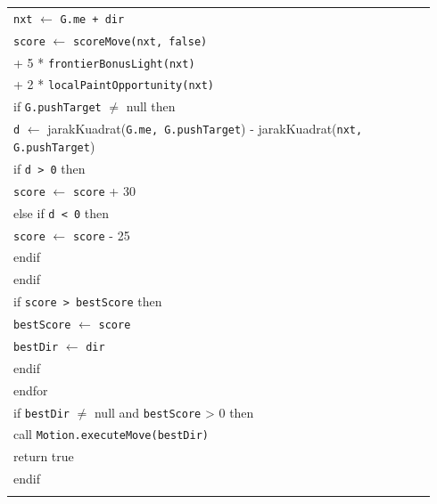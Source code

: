 \documentclass{article}
\newenvironment{pseudobox}
{
\centering
\begin{longtable}{|p{0.94\linewidth}|}
\hline
}
{
\\ \hline
\end{longtable}
\vspace{0.05cm}
}
\begin{document}
\begin{enumerate}[label=\alph*.]
\begin{enumerate}[label=\alph*.]
\begin{pseudobox}
\hspace*{3em}\texttt{nxt} $\leftarrow$ \texttt{G.me + dir} \\
\hspace*{3em}\texttt{score} $\leftarrow$ \texttt{scoreMove(nxt, false)} \\
\hspace*{6em}+ 5 * \texttt{frontierBonusLight(nxt)} \\
\hspace*{6em}+ 2 * \texttt{localPaintOpportunity(nxt)} \\

\hspace*{3em}if \texttt{G.pushTarget} $\neq$ null then \\
\hspace*{4.5em}\texttt{d} $\leftarrow$ jarakKuadrat(\texttt{G.me, G.pushTarget}) - jarakKuadrat(\texttt{nxt, G.pushTarget}) \\
\hspace*{4.5em}if \texttt{d > 0} then \\
\hspace*{6em}\texttt{score} $\leftarrow$ \texttt{score} + 30 \\
\hspace*{4.5em}else if \texttt{d < 0} then \\
\hspace*{6em}\texttt{score} $\leftarrow$ \texttt{score} - 25 \\
\hspace*{4.5em}endif \\
\hspace*{3em}endif \\

\hspace*{3em}if \texttt{score > bestScore} then \\
\hspace*{4.5em}\texttt{bestScore} $\leftarrow$ \texttt{score} \\
\hspace*{4.5em}\texttt{bestDir} $\leftarrow$ \texttt{dir} \\
\hspace*{3em}endif \\
\hspace*{1.5em}endfor \\

\hspace*{1.5em}if \texttt{bestDir} $\neq$ null and \texttt{bestScore} > 0 then \\
\hspace*{3em}call \texttt{Motion.executeMove(bestDir)} \\
\hspace*{3em}return true \\
\hspace*{1.5em}endif \\


\end{pseudobox}
\end{enumerate}
\end{enumerate}
\end{document}
